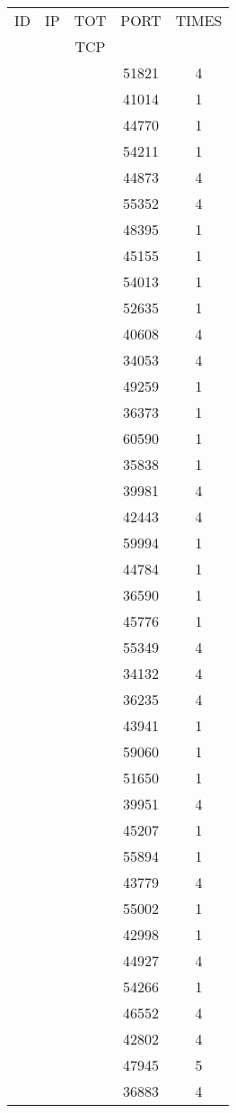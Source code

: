 \documentclass[a4paper]{scrartcl}
\begin{document}
\begin{minipage}[b]{0.5\linewidth}
\begin{tabular}{| c | c | c | c | c |}
\hline
ID & IP & TOT & PORT & TIMES \\ 
   &    & TCP &      &       \\ 
\hline
& & & 51821 & 4 \\ & & & 41014 & 1 \\ & & & 44770 & 1 \\ & & & 54211 & 1 \\ & & & 44873 & 4 \\ & & & 55352 & 4 \\ & & & 48395 & 1 \\ & & & 45155 & 1 \\ & & & 54013 & 1 \\ & & & 52635 & 1 \\ & & & 40608 & 4 \\ & & & 34053 & 4 \\ & & & 49259 & 1 \\ & & & 36373 & 1 \\ & & & 60590 & 1 \\ & & & 35838 & 1 \\ & & & 39981 & 4 \\ & & & 42443 & 4 \\ & & & 59994 & 1 \\ & & & 44784 & 1 \\ & & & 36590 & 1 \\ & & & 45776 & 1 \\ & & & 55349 & 4 \\ & & & 34132 & 4 \\ & & & 36235 & 4 \\ & & & 43941 & 1 \\ & & & 59060 & 1 \\ & & & 51650 & 1 \\ & & & 39951 & 4 \\ & & & 45207 & 1 \\ & & & 55894 & 1 \\ & & & 43779 & 4 \\ & & & 55002 & 1 \\ & & & 42998 & 1 \\ & & & 44927 & 4 \\ & & & 54266 & 1 \\ & & & 46552 & 4 \\ & & & 42802 & 4 \\ & & & 47945 & 5 \\ & & & 36883 & 4 \\ \hline\end{tabular}\end{minipage} \hfill\begin{minipage}[b]{0.5\linewidth}\begin{tabular}{| c | c | c | c | c |}

\end{tabular}
\end{minipage}
\end{document}
